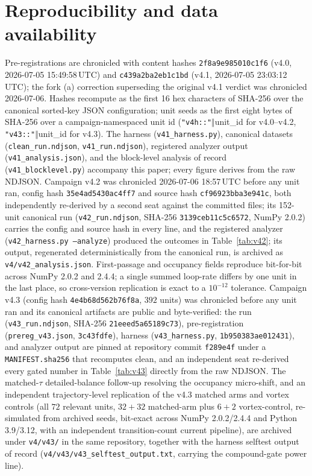 \documentclass[11pt]{article}
\begin{document}
\section*{Reproducibility and data availability}
Pre-registrations are chronicled with content hashes \texttt{2f8a9e985010c1f6} (v4.0, 2026-07-05 15:49:58\,UTC) and \texttt{c439a2ba2eb1c1bd} (v4.1, 2026-07-05 23:03:12\,UTC); the fork (a) correction superseding the original v4.1 verdict was chronicled 2026-07-06. Hashes recompute as the first 16 hex characters of SHA-256 over the canonical sorted-key JSON configuration; unit seeds as the first eight bytes of SHA-256 over a campaign-namespaced unit id (\texttt{"v4h::"}$\Vert$unit\_id for v4.0--v4.2, \texttt{"v43::"}$\Vert$unit\_id for v4.3). The harness (\texttt{v41\_harness.py}), canonical datasets (\texttt{clean\_run.ndjson}, \texttt{v41\_run.ndjson}), registered analyzer output (\texttt{v41\_analysis.json}), and the block-level analysis of record (\texttt{v41\_blocklevel.py}) accompany this paper; every figure derives from the raw NDJSON. Campaign v4.2 was chronicled 2026-07-06 18:57\,UTC before any unit ran, config hash \texttt{35e4ad5430ac4ff7} and source hash \texttt{cf96923bba3e941c}, both independently re-derived by a second seat against the committed files; its 152-unit canonical run (\texttt{v42\_run.ndjson}, SHA-256 \texttt{3139ceb11c5c6572}, NumPy 2.0.2) carries the config and source hash in every line, and the registered analyzer (\texttt{v42\_harness.py --analyze}) produced the outcomes in Table~\ref{tab:v42}; its output, regenerated deterministically from the canonical run, is archived as \texttt{v4/v42\_analysis.json}. First-passage and occupancy fields reproduce bit-for-bit across NumPy 2.0.2 and 2.4.4; a single summed loop-rate differs by one unit in the last place, so cross-version replication is exact to a $10^{-12}$ tolerance. Campaign v4.3 (config hash \texttt{4e4b68d562b76f8a}, $392$ units) was chronicled before any unit ran and its canonical artifacts are public and byte-verified: the run (\texttt{v43\_run.ndjson}, SHA-256 \texttt{21eeed5a65189c73}), pre-registration (\texttt{prereg\_v43.json}, \texttt{3c43fdfe}), harness (\texttt{v43\_harness.py}, \texttt{1b950383ae012431}), and analyzer output are pinned at repository commit \texttt{f289e4f} under a \texttt{MANIFEST.sha256} that recomputes clean, and an independent seat re-derived every gated number in Table~\ref{tab:v43} directly from the raw NDJSON. The matched-$\tau$ detailed-balance follow-up resolving the occupancy micro-shift, and an independent trajectory-level replication of the v4.3 matched arms and vortex controls (all $72$ relevant units, $32{+}32$ matched-arm plus $6{+}2$ vortex-control, re-simulated from archived seeds, bit-exact across NumPy 2.0.2/2.4.4 and Python 3.9/3.12, with an independent transition-count current pipeline), are archived under \texttt{v4/v43/} in the same repository, together with the harness selftest output of record (\texttt{v4/v43/v43\_selftest\_output.txt}, carrying the compound-gate power line).
\end{document}
